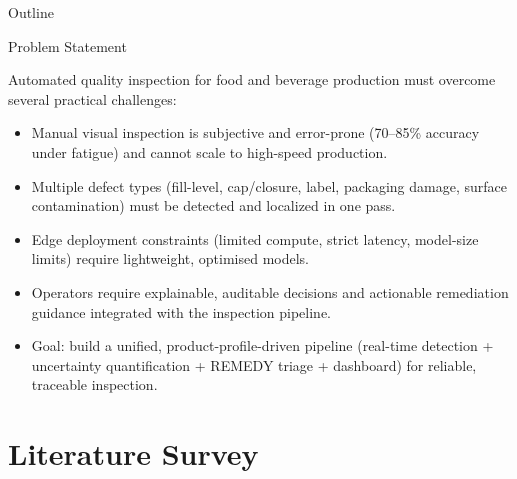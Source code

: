\documentclass[10pt]{beamer}
\begin{document}
\begin{frame}
    \maketitle
\end{frame}

\begin{frame}{Outline}
    \tableofcontents[hideallsubsections]
\end{frame}

\begin{frame}{Problem Statement}

\small
Automated quality inspection for food and beverage production must overcome several practical challenges:

\begin{itemize}\setlength{\itemsep}{6pt}
    \item Manual visual inspection is subjective and error-prone (70--85\% accuracy under fatigue) and cannot scale to high-speed production.
    \item Multiple defect types (fill-level, cap/closure, label, packaging damage, surface contamination) must be detected and localized in one pass.
    \item Edge deployment constraints (limited compute, strict latency, model-size limits) require lightweight, optimised models.
    \item Operators require explainable, auditable decisions and actionable remediation guidance integrated with the inspection pipeline.
    \item Goal: build a unified, product-profile-driven pipeline (real-time detection + uncertainty quantification + REMEDY triage + dashboard) for reliable, traceable inspection.
\end{itemize}

\end{frame}


\section{Literature Survey}
\end{document}
